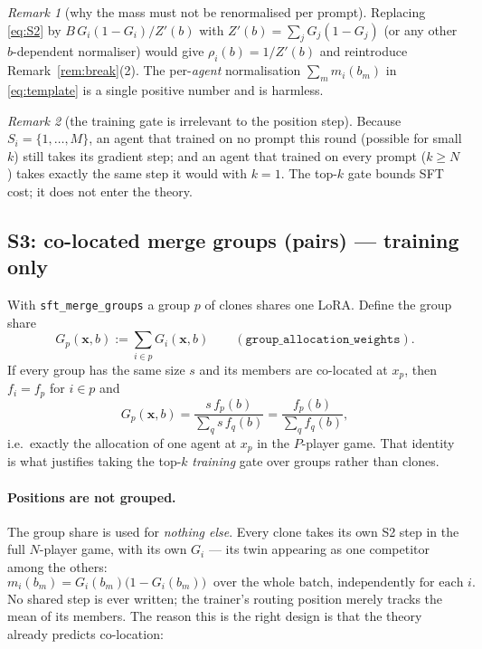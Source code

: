 \documentclass[11pt]{article}
\theoremstyle{remark}
\newtheorem{remark}{Remark}
\newcommand{\bx}{\mathbf{x}}
\newcommand{\cfg}[1]{\texttt{#1}}
\begin{document}
\begin{remark}[why the mass must not be renormalised per prompt]
Replacing \eqref{eq:S2} by $B\,G_i(1-G_i)/Z'(b)$ with
$Z'(b)=\sum_{j}G_j(1-G_j)$ (or any other $b$-dependent normaliser) would
give $\rho_i(b)=1/Z'(b)$ and reintroduce Remark~\ref{rem:break}(2). The
per-\emph{agent} normalisation $\sum_{m}m_i(b_m)$ in \eqref{eq:template} is a
single positive number and is harmless.
\end{remark}
\begin{remark}[the training gate is irrelevant to the position step]
Because $S_i=\{1,\dots,M\}$, an agent that trained on no prompt this round
(possible for small $k$) still takes its gradient step; and an agent that
trained on every prompt ($k\ge N$) takes exactly the same step it would with
$k=1$. The top-$k$ gate bounds SFT cost; it does not enter the theory.
\end{remark}

\subsection{S3: co-located merge groups (pairs) --- training only}
\label{sec:S3}
With \cfg{sft\_merge\_groups} a group $p$ of clones shares one LoRA. Define
the group share
\begin{equation}
  G_p(\bx,b) := \sum_{i\in p} G_i(\bx,b)
  \qquad(\texttt{group\_allocation\_weights}).
\end{equation}
If every group has the same size $s$ and its members are co-located at
$x_p$, then $f_i=f_p$ for $i\in p$ and
\[
  G_p(\bx,b)=\frac{s\,f_p(b)}{\sum_q s\,f_q(b)}=\frac{f_p(b)}{\sum_q f_q(b)},
\]
i.e.\ exactly the allocation of one agent at $x_p$ in the $P$-player game.
That identity is what justifies taking the top-$k$ \emph{training} gate over
groups rather than clones.

\paragraph{Positions are not grouped.}
The group share is used for \emph{nothing else}. Every clone takes its own
S2 step in the full $N$-player game, with its own $G_i$ --- its twin
appearing as one competitor among the others:
\begin{equation}
  m_i(b_m)=G_i(b_m)\big(1-G_i(b_m)\big)\ \text{ over the whole batch,
  independently for each } i .
  \label{eq:S3}
\end{equation}
No shared step is ever written; the trainer's routing position merely tracks
the mean of its members. The reason this is the right design is that the
theory already predicts co-location:
\end{document}

